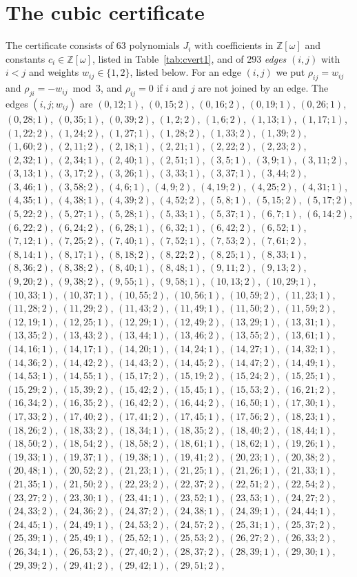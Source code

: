 \documentclass[11pt]{article}
\newcommand{\Z}{\mathbb{Z}}
\begin{document}
\section{The cubic certificate}

The certificate consists of 63 polynomials $J_i$ with coefficients in $\Z[\omega]$ and constants $c_i\in\Z[\omega]$, listed in Table~\ref{tab:cvert1}, and of 293 \emph{edges} $(i,j)$ with $i<j$ and weights $w_{ij}\in\{1,2\}$, listed below. For an edge $(i,j)$ we put $\rho_{ij}=w_{ij}$ and $\rho_{ji}=-w_{ij}\bmod 3$, and $\rho_{ij}=0$ if $i$ and $j$ are not joined by an edge.
The edges $(i,j;w_{ij})$ are $(0,12;1)$, $(0,15;2)$, $(0,16;2)$, $(0,19;1)$, $(0,26;1)$, $(0,28;1)$, $(0,35;1)$, $(0,39;2)$, $(1,2;2)$, $(1,6;2)$, $(1,13;1)$, $(1,17;1)$, $(1,22;2)$, $(1,24;2)$, $(1,27;1)$, $(1,28;2)$, $(1,33;2)$, $(1,39;2)$, $(1,60;2)$, $(2,11;2)$, $(2,18;1)$, $(2,21;1)$, $(2,22;2)$, $(2,23;2)$, $(2,32;1)$, $(2,34;1)$, $(2,40;1)$, $(2,51;1)$, $(3,5;1)$, $(3,9;1)$, $(3,11;2)$, $(3,13;1)$, $(3,17;2)$, $(3,26;1)$, $(3,33;1)$, $(3,37;1)$, $(3,44;2)$, $(3,46;1)$, $(3,58;2)$, $(4,6;1)$, $(4,9;2)$, $(4,19;2)$, $(4,25;2)$, $(4,31;1)$, $(4,35;1)$, $(4,38;1)$, $(4,39;2)$, $(4,52;2)$, $(5,8;1)$, $(5,15;2)$, $(5,17;2)$, $(5,22;2)$, $(5,27;1)$, $(5,28;1)$, $(5,33;1)$, $(5,37;1)$, $(6,7;1)$, $(6,14;2)$, $(6,22;2)$, $(6,24;2)$, $(6,28;1)$, $(6,32;1)$, $(6,42;2)$, $(6,52;1)$, $(7,12;1)$, $(7,25;2)$, $(7,40;1)$, $(7,52;1)$, $(7,53;2)$, $(7,61;2)$, $(8,14;1)$, $(8,17;1)$, $(8,18;2)$, $(8,22;2)$, $(8,25;1)$, $(8,33;1)$, $(8,36;2)$, $(8,38;2)$, $(8,40;1)$, $(8,48;1)$, $(9,11;2)$, $(9,13;2)$, $(9,20;2)$, $(9,38;2)$, $(9,55;1)$, $(9,58;1)$, $(10,13;2)$, $(10,29;1)$, $(10,33;1)$, $(10,37;1)$, $(10,55;2)$, $(10,56;1)$, $(10,59;2)$, $(11,23;1)$, $(11,28;2)$, $(11,29;2)$, $(11,43;2)$, $(11,49;1)$, $(11,50;2)$, $(11,59;2)$, $(12,19;1)$, $(12,25;1)$, $(12,29;1)$, $(12,49;2)$, $(13,29;1)$, $(13,31;1)$, $(13,35;2)$, $(13,43;2)$, $(13,44;1)$, $(13,46;2)$, $(13,55;2)$, $(13,61;1)$, $(14,16;1)$, $(14,17;1)$, $(14,20;1)$, $(14,24;1)$, $(14,27;1)$, $(14,32;1)$, $(14,36;2)$, $(14,42;2)$, $(14,43;2)$, $(14,45;2)$, $(14,47;2)$, $(14,49;1)$, $(14,53;1)$, $(14,55;1)$, $(15,17;2)$, $(15,19;2)$, $(15,24;2)$, $(15,25;1)$, $(15,29;2)$, $(15,39;2)$, $(15,42;2)$, $(15,45;1)$, $(15,53;2)$, $(16,21;2)$, $(16,34;2)$, $(16,35;2)$, $(16,42;2)$, $(16,44;2)$, $(16,50;1)$, $(17,30;1)$, $(17,33;2)$, $(17,40;2)$, $(17,41;2)$, $(17,45;1)$, $(17,56;2)$, $(18,23;1)$, $(18,26;2)$, $(18,33;2)$, $(18,34;1)$, $(18,35;2)$, $(18,40;2)$, $(18,44;1)$, $(18,50;2)$, $(18,54;2)$, $(18,58;2)$, $(18,61;1)$, $(18,62;1)$, $(19,26;1)$, $(19,33;1)$, $(19,37;1)$, $(19,38;1)$, $(19,41;2)$, $(20,23;1)$, $(20,38;2)$, $(20,48;1)$, $(20,52;2)$, $(21,23;1)$, $(21,25;1)$, $(21,26;1)$, $(21,33;1)$, $(21,35;1)$, $(21,50;2)$, $(22,23;2)$, $(22,37;2)$, $(22,51;2)$, $(22,54;2)$, $(23,27;2)$, $(23,30;1)$, $(23,41;1)$, $(23,52;1)$, $(23,53;1)$, $(24,27;2)$, $(24,33;2)$, $(24,36;2)$, $(24,37;2)$, $(24,38;1)$, $(24,39;1)$, $(24,44;1)$, $(24,45;1)$, $(24,49;1)$, $(24,53;2)$, $(24,57;2)$, $(25,31;1)$, $(25,37;2)$, $(25,39;1)$, $(25,49;1)$, $(25,52;1)$, $(25,53;2)$, $(26,27;2)$, $(26,33;2)$, $(26,34;1)$, $(26,53;2)$, $(27,40;2)$, $(28,37;2)$, $(28,39;1)$, $(29,30;1)$, $(29,39;2)$, $(29,41;2)$, $(29,42;1)$, $(29,51;2)$, 
\end{document}
